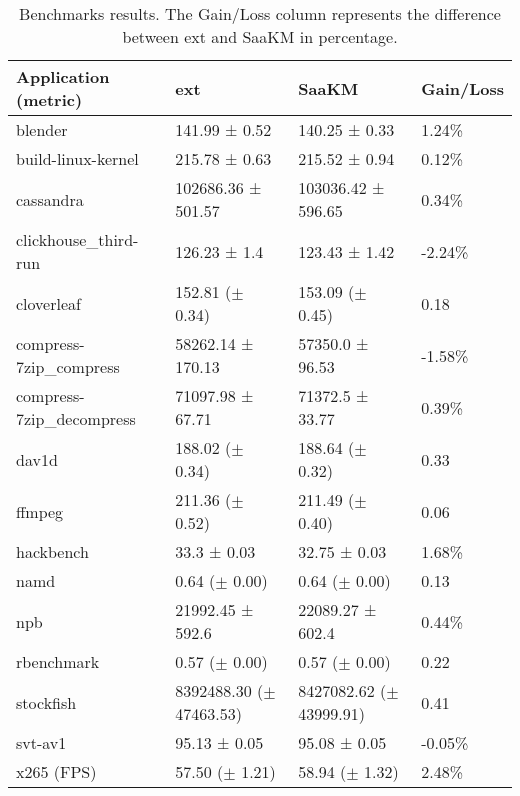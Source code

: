 \begin{table*}[p]
        \centering
        \caption{Benchmarks results. The Gain/Loss column represents the difference between ext and SaaKM in percentage.}
        \label{tab:bench-res}
        \begin{tabular}{|l|l|l|l|}
        \hline
                Application (metric) &ext & SaaKM & Gain/Loss \\
                \hline
                blender & 141.99 ± 0.52 & 140.25 ± 0.33 & 1.24\% \\
                build-linux-kernel & 215.78 ± 0.63 & 215.52 ± 0.94 & 0.12\% \\
                cassandra & 102686.36 ± 501.57 & 103036.42 ± 596.65 & 0.34\% \\
                clickhouse\_third-run & 126.23 ± 1.4 & 123.43 ± 1.42 & -2.24\% \\
                cloverleaf & 152.81 ($\pm$ 0.34) & 153.09 ($\pm$ 0.45) & 0.18 \\
                compress-7zip\_compress & 58262.14 ± 170.13 & 57350.0 ± 96.53 & -1.58\% \\
                compress-7zip\_decompress & 71097.98 ± 67.71 & 71372.5 ± 33.77 & 0.39\% \\
                dav1d & 188.02 ($\pm$ 0.34) & 188.64 ($\pm$ 0.32) & 0.33 \\
                ffmpeg & 211.36 ($\pm$ 0.52) & 211.49 ($\pm$ 0.40) & 0.06 \\
                hackbench & 33.3 ± 0.03 & 32.75 ± 0.03 & 1.68\% \\
                namd & 0.64 ($\pm$ 0.00) & 0.64 ($\pm$ 0.00) & 0.13 \\
                npb & 21992.45 ± 592.6 & 22089.27 ± 602.4 & 0.44\% \\
                rbenchmark & 0.57 ($\pm$ 0.00) & 0.57 ($\pm$ 0.00) & 0.22 \\
                stockfish & 8392488.30 ($\pm$ 47463.53) & 8427082.62 ($\pm$ 43999.91) & 0.41 \\
                svt-av1 & 95.13 ± 0.05 & 95.08 ± 0.05 & -0.05\% \\
                x265 (FPS) & 57.50 ($\pm$ 1.21) & 58.94 ($\pm$ 1.32) & 2.48\% \\
                \hline
        
        \end{tabular}
\end{table*}

